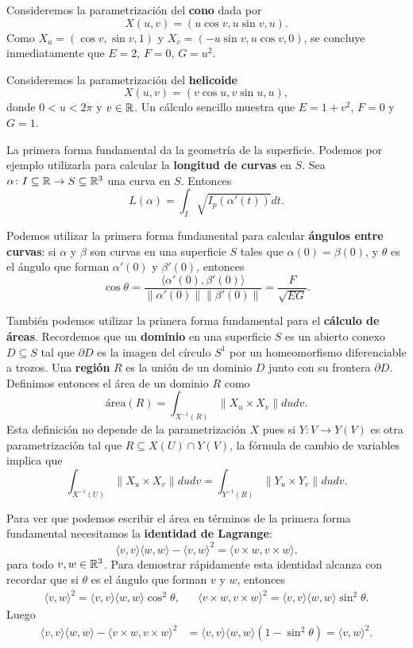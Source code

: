 \begin{example}
	Consideremos la parametrización del \textbf{cono} dada por
	\[
		X(u,v)=(u\cos v,u\sin v,u).
	\]
	Como $X_u=(\cos v,\sin v,1)$ y $X_v=(-u\sin v,u\cos v,0)$, se concluye inmediatamente que
	$E=2$, $F=0$, $G=u^2$.
\end{example}

\begin{example}
	Consideremos la parametrización del \textbf{helicoide} 
	\[
		X(u,v)=(v\cos u,v\sin u,u),
	\]
	donde $0<u<2\pi$ y $v\in\mathbb{R}$. Un cálculo sencillo muestra que $E=1+v^2$, $F=0$ y $G=1$. 
\end{example}

La primera forma fundamental da la geometría de la superficie. Podemos por
ejemplo utilizarla para calcular la \textbf{longitud de curvas} en $S$. Sea
$\alpha\colon I\subseteq\mathbb{R}\to S\subseteq\mathbb{R}^3$ una curva en $S$. Entonces
\[
	L(\alpha)=\int_I\sqrt{I_p(\alpha'(t))}dt.
\]

Podemos utilizar la primera forma fundamental para calcular \textbf{ángulos entre
curvas}: si $\alpha$ y $\beta$ son curvas en una superficie $S$ tales que
$\alpha(0)=\beta(0)$, y $\theta$ es el ángulo que forman $\alpha'(0)$ y
$\beta'(0)$, entonces 
\[
	\cos\theta=\frac{\langle \alpha'(0),\beta'(0)\rangle}{\|\alpha'(0)\|\|\beta'(0)\|}=\frac{F}{\sqrt{EG}}.
\]

También podemos utilizar la primera forma fundamental para el \textbf{cálculo de áreas}.
Recordemos que un \textbf{dominio} en una superficie $S$ es un abierto conexo
$D\subseteq S$ tal que $\partial D$ es la imagen del círculo $S^1$ por un
homeomorfismo diferenciable a trozos. Una \textbf{región} $R$ es la unión de un
dominio $D$ junto con su frontera $\partial D$. Definimos entonces
el área de un dominio $R$ como
\[
	\text{área}(R)=\int_{X^{-1}(R)}\|X_u\times X_v\|dudv.
\]
Esta definición no depende de la parametrización $X$ pues si $Y\colon V\to
Y(V)$ es otra parametrización tal que $R\subseteq X(U)\cap Y(V)$, la fórmula de
cambio de variables implica que
\[
	\int_{X^{-1}(U)}\|X_u\times X_v\|dudv=\int_{Y^{-1}(R)}\|Y_u\times Y_v\|dudv.
\]

Para ver que podemos escribir el área en términos de la primera forma fundamental necesitamos 
la \textbf{identidad de Lagrange}:
\[
	\langle v,v\rangle\langle w,w\rangle-\langle v,w\rangle^2=\langle v\times w,v\times w\rangle.
\]
para todo $v,w\in\mathbb{R}^3$. Para demostrar rápidamente esta identidad alcanza con recordar que si $\theta$ es el ángulo que forman $v$ y $w$, entonces 
\begin{align*}
\langle v,w\rangle^2=\langle v,v\rangle\langle w,w\rangle\cos^2\theta,
&&\langle v\times w,v\times w\rangle^2=\langle v,v\rangle\langle w,w\rangle\sin^2\theta. 
\end{align*}
Luego
\begin{align*}
	\langle v,v\rangle\langle w,w\rangle-\langle v\times w,v\times w\rangle^2
	&=\langle v,v\rangle\langle w,w\rangle(1-\sin^2\theta)
	=\langle v,w\rangle^2.
\end{align*}

